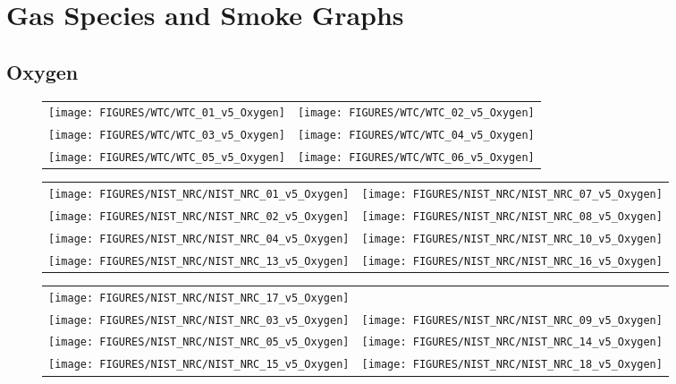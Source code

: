\chapter{Gas Species and Smoke Graphs}


\section{Oxygen}


\begin{figure}[h]
\begin{tabular*}{\textwidth}{l@{\extracolsep{\fill}}r}
\texttt{[image: FIGURES/WTC/WTC\_01\_v5\_Oxygen]} &
\texttt{[image: FIGURES/WTC/WTC\_02\_v5\_Oxygen]} \\
\texttt{[image: FIGURES/WTC/WTC\_03\_v5\_Oxygen]} &
\texttt{[image: FIGURES/WTC/WTC\_04\_v5\_Oxygen]} \\
\texttt{[image: FIGURES/WTC/WTC\_05\_v5\_Oxygen]} &
\texttt{[image: FIGURES/WTC/WTC\_06\_v5\_Oxygen]}
\end{tabular*}
\label{NIST_WTC_Oxygen}
\end{figure}



\begin{figure}[p]
\begin{tabular*}{\textwidth}{l@{\extracolsep{\fill}}r}
\texttt{[image: FIGURES/NIST\_NRC/NIST\_NRC\_01\_v5\_Oxygen]} &
\texttt{[image: FIGURES/NIST\_NRC/NIST\_NRC\_07\_v5\_Oxygen]} \\
\texttt{[image: FIGURES/NIST\_NRC/NIST\_NRC\_02\_v5\_Oxygen]} &
\texttt{[image: FIGURES/NIST\_NRC/NIST\_NRC\_08\_v5\_Oxygen]} \\
\texttt{[image: FIGURES/NIST\_NRC/NIST\_NRC\_04\_v5\_Oxygen]} &
\texttt{[image: FIGURES/NIST\_NRC/NIST\_NRC\_10\_v5\_Oxygen]} \\
\texttt{[image: FIGURES/NIST\_NRC/NIST\_NRC\_13\_v5\_Oxygen]} &
\texttt{[image: FIGURES/NIST\_NRC/NIST\_NRC\_16\_v5\_Oxygen]}
\end{tabular*}
\label{NIST_NRC_Gas_Closed}
\end{figure}

\begin{figure}[p]
\begin{tabular*}{\textwidth}{l@{\extracolsep{\fill}}r}
\texttt{[image: FIGURES/NIST\_NRC/NIST\_NRC\_17\_v5\_Oxygen]} &
 \\
\texttt{[image: FIGURES/NIST\_NRC/NIST\_NRC\_03\_v5\_Oxygen]} &
\texttt{[image: FIGURES/NIST\_NRC/NIST\_NRC\_09\_v5\_Oxygen]} \\
\texttt{[image: FIGURES/NIST\_NRC/NIST\_NRC\_05\_v5\_Oxygen]} &
\texttt{[image: FIGURES/NIST\_NRC/NIST\_NRC\_14\_v5\_Oxygen]} \\
\texttt{[image: FIGURES/NIST\_NRC/NIST\_NRC\_15\_v5\_Oxygen]} &
\texttt{[image: FIGURES/NIST\_NRC/NIST\_NRC\_18\_v5\_Oxygen]}
\end{tabular*}
\label{NIST_NRC_Gas_Open}
\end{figure}

